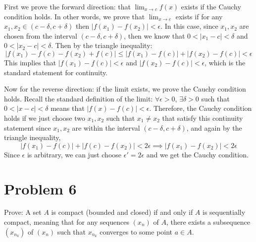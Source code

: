 \documentclass[10pt]{article}
\begin{document}
	\begin{solution}
		First we prove the forward direction: that $\lim_{x \to c} f(x)$ exists if the Cauchy condition holds. 
		In other words, we prove that $\lim_{x \to c}$ exists if for any $x_1, x_2 \in (c - \delta, c + \delta)$
		then $|f(x_1) - f(x_2)| < \epsilon$. In this case, since $x_1, x_2$ are chosen from the interval $(c -
		\delta, c+\delta)$, then we know that $0 < |x_1 - c| < \delta$ and $0 < |x_2 - c| < \delta$. Then by 
		the triangle inequality: 
		\[
		|f(x_1) - f(c) - f(x_2) + f(c)| \le |f(x_1) - f(c)| + |f(x_2) - f(c)| < \epsilon
		\] 
		This implies that $|f(x_1) - f(c)| < \epsilon$ and $|f(x_2) - f(c)| < \epsilon$, which is the standard 
		statement for continuity. 

		Now for the reverse direction: if the limit exists, we prove the Cauchy condition holds. Recall the 
		standard definition of the limit: $\forall \epsilon >0$, $\exists \delta > 0$ such that $0 < |x - c| <
		\delta$ means that $|f(x) - f(c)| < \epsilon$. Therefore, the Cauchy condition holds if we just choose 
		two $x_1, x_2$ such that $x_1 \neq x_2$ that satisfy this continuity statement since $x_1, x_2$ are 
		within the interval $(c - \delta, c + \delta)$, and again by the triangle inequality, 
		\[
		|f(x_1) - f(c)| + |f(c) - f(x_2)| < 2\epsilon \implies |f(x_1) - f(x_2)| < 2 \epsilon 
		\]
		Since $\epsilon$ is arbitrary, we can just choose $\epsilon' = 2\epsilon$ and we get the Cauchy condition. 
	\end{solution}
	\pagebreak

	\section*{Problem 6}
	Prove: A set $A$ is compact (bounded and closed) if and only if $A$ is sequentially compact, meaning that for
	any sequences $(x_n)$ of $A$, there exists a subsequence $(x_{n_k})$ of $(x_n)$ such that $x_{n_k}$ converges
	to some point $a \in A$.
\end{document}
